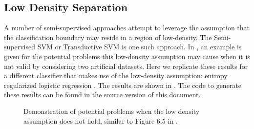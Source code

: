 \documentclass[runningheads,a4paper]{llncs}\usepackage[]{graphicx}\usepackage[]{color}
\newenvironment{knitrout}{}{} %
\begin{document}
\subsection{Low Density Separation}
A number of semi-supervised approaches attempt to leverage the assumption that the classification boundary may reside in a region of low-density. The Semi-supervised SVM or Transductive SVM \cite{Joachims1999} is one such approach. In \cite[Chapter 6]{Zhu2009}, an example is given for the potential problems this low-density assumption may cause when it is not valid by considering two artificial datasets. Here we replicate these results for a different classifier that makes use of the low-density assumption: entropy regularized logistic regression \cite{Grandvalet2005}. The results are shown in . The code to generate these results can be found in the source version of this document.
\begin{knitrout}\footnotesize
{}\color{fgcolor}\begin{figure}
\caption[Demonstration of potential problems when the low density assumption does not hold, similar to Figure 6.5 in \cite{Zhu2009}]{Demonstration of potential problems when the low density assumption does not hold, similar to Figure 6.5 in \cite{Zhu2009}.}\label{fig:lowdensityproblem}
\end{figure}


\end{knitrout}
\end{document}
